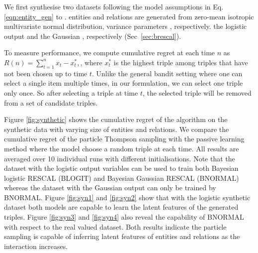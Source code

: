 We first synthesise two datasets 
following the model assumptions in Eq. \ref{eqn:entity_gen} to 
\verify{\ref{eqn:triple_gen}}. 
entities and relations are generated from zero-mean isotropic multivariate normal distribution,  
variance parameters , respectively.
 the logistic output and the Gaussian , respectively (Sec~\ref{sec:brescal}). 

To measure performance, we compute cumulative regret 
at each time $n$ as $R(n) = \sum_{t=1}^{n} x_t - x^{*}_t,$, 
where $x^*_t$ is the highest triple among triples that have not been chosen up to time $t$. Unlike the general 
bandit setting where one can select a single item multiple times, in our formulation, we can select one triple 
only once. So after selecting a triple at time $t$, the selected triple will be removed from a set of candidate 
triples.

Figure \ref{fig:synthetic} shows the cumulative regret of the algorithm on the synthetic data with varying size of 
entities and relations. We compare the cumulative regret of the particle Thompson sampling with the passive 
learning method where the model choose a random triple at each time. All results are averaged over 10 
individual runs with different initialisations. 
Note that the dataset with the logistic output variables can be used to train both Bayesian logistic RESCAL (BLOGIT) and Bayesian Gaussian RESCAL (BNORMAL) whereas the dataset with the Gaussian output can only be trained by BNORMAL.
Figure \ref{fig:syn1} and \ref{fig:syn2} show that with the logistic synthetic dataset both models are capable to learn the latent features of the generated triples. 
Figure \ref{fig:syn3} and \ref{fig:syn4} also reveal the capability of BNORMAL with respect to the real valued dataset.
Both results indicate the particle sampling is capable of inferring latent features 
of entities and relations as the interaction increases.

